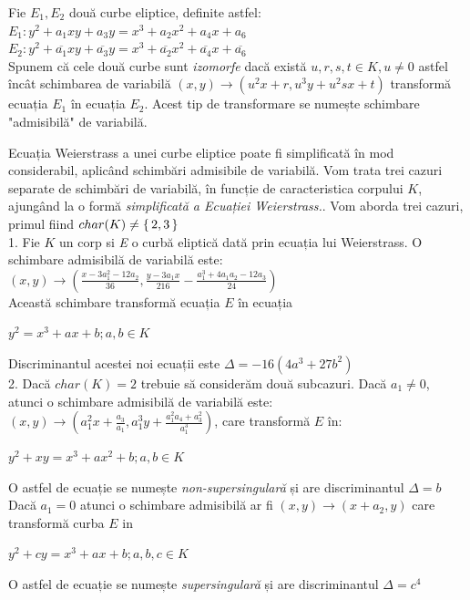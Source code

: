 \begin{dfn}
Fie $E_1, E_2$ două curbe eliptice, definite astfel: \\
$E_1 : y^2 + a_1xy + a_3y = x^3 + a_2x^{2} + a_4x + a_6$ \\
$E_2 : y^2 + \overline{a_1}xy + \overline{a_3}y = x^3 + \overline{a_2}x^{2} + \overline{a_4}x + \overline{a_6} $ \\
Spunem că cele două curbe sunt \textit{izomorfe} dacă există $u,r,s,t\in K, u\neq 0$ astfel încât schimbarea de variabilă $(x, y)\rightarrow (u^2x + r, u^3y + u^2sx + t)$ transformă ecuația $E_1$ în ecuația $E_2$. Acest tip de transformare se numește schimbare "admisibilă" de variabilă.
\end{dfn}
\begin{dfn}
Ecuația Weierstrass a unei curbe eliptice poate fi simplificată în mod considerabil, aplicând schimbări admisibile de variabilă. Vom trata trei cazuri separate de schimbări de variabilă, în funcție de caracteristica corpului $K$, ajungând la o formă \textit{simplificată a Ecuației Weierstrass.}. Vom aborda trei cazuri, primul fiind $char(K) \neq \set {2,3}$ \\

  1. Fie $K$ un corp si \textit{E} o curbă eliptică dată prin ecuația lui Weierstrass. O schimbare admisibilă de variabilă este:
$(x, y) \rightarrow (\frac{x - 3a_1^{2} - 12a_2}{36}, \frac{y-3a_1x}{216} - \frac{a_1^{3} + 4a_1a_2 - 12a_3}{24})$ \\
Această schimbare transformă ecuația $E$ în ecuația 
\begin{center} $y^2 = x^3 + ax + b; a, b\in K$\end{center}
Discriminantul acestei noi ecuații este $\Delta = -16(4a^3 + 27b^2)$ \\

2. Dacă $char(K) = 2$ trebuie să considerăm două subcazuri. Dacă $a_1 \neq 0$, atunci o schimbare admisibilă de variabilă este: $(x, y) \rightarrow (a_1^2x + \frac{a_3}{a_1}, a_1^3y + \frac{a_1^2a_4 + a_3^2}{a_1^3} )$, care transformă $E$ în:
\begin{center}$y^2 + xy = x^3 + ax^2 + b; a, b\in K$\end{center}
O astfel de ecuație se numește \textit{non-supersingulară} și are discriminantul $\Delta = b$ \\
Dacă $a_1 = 0$ atunci o schimbare admisibilă ar fi $(x, y)\rightarrow (x + a_2, y)$ care transformă curba $E$ in
\begin{center} $y^2 + cy = x^3 + ax + b; a,b,c\in K$ \end{center}
O astfel de ecuație se numește \textit{supersingulară} și are discriminantul $\Delta = c^4$
\\


\end{dfn}
